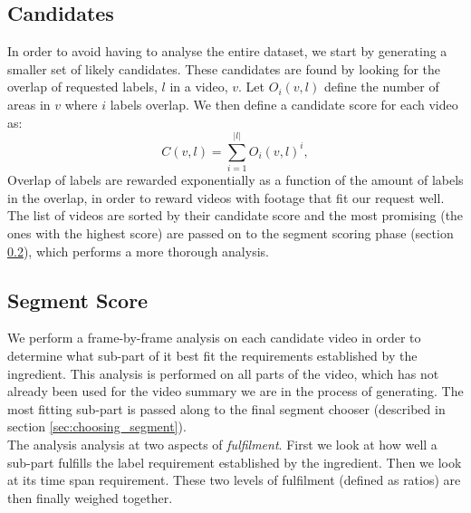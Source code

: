 \subsection{Candidates}\label{sec:candidates}
%
In order to avoid having to analyse the entire dataset, we start by generating a smaller set of likely candidates. These candidates are found by looking for the overlap of requested labels, $l$ in a video, $v$. Let $O_i(v,l)$ define the number of areas in $v$ where $i$ labels overlap. We then define a candidate score for each video as:
%
\[
C(v, l) = \sum_{i=1}^{|l|} O_i(v,l)^{i},
\]
%
Overlap of labels are rewarded exponentially as a function of the amount of labels in the overlap, in order to reward videos with footage that fit our request well.\\
The list of videos are sorted by their candidate score and the most promising (the ones with the highest score) are passed on to the segment scoring phase (section \ref{sec:segment_score}), which performs a more thorough analysis.
%
\subsection{Segment Score}\label{sec:segment_score}
%
We perform a frame-by-frame analysis on each candidate video in order to determine what sub-part of it best fit the requirements established by the ingredient. This analysis is performed on all parts of the video, which has not already been used for the video summary we are in the process of generating. The most fitting sub-part is passed along to the final segment chooser (described in section \ref{sec:choosing_segment}).\\
The analysis analysis at two aspects of \textit{fulfilment}. First we look at how well a sub-part fulfills the label requirement established by the ingredient. Then we look at its time span requirement. These two levels of fulfilment (defined as ratios) are then finally weighed together.
%

